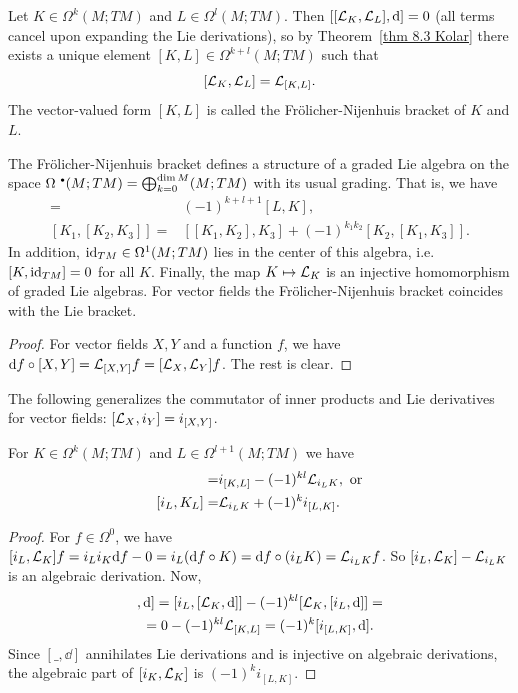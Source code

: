 \begin{defn}
    Let $K\in\Omega^k(M;TM)$ and $L\in\Omega^l(M;TM)$. Then $[[\mathcal{L}_K,\mathcal{L}_L],{\mathrm{d}}]=0$ (all terms cancel upon expanding the Lie derivations), so by Theorem~\ref{thm 8.3 Kolar} there exists a unique element $[K,L]\in \Omega^{k+l}(M;TM)$ such that 
    \[[\mathcal{L}_K,\mathcal{L}_L]=\mathcal{L}_{[K,L]}.\]
    The vector-valued form $[K,L]$ is called the Fr\"olicher-Nijenhuis bracket of $K$ and $L$.
\end{defn}


\begin{thm}
    The Fr\"olicher-Nijenhuis bracket defines a structure of a graded Lie algebra on the space $\Omega^{\smbullet}(M;TM)=\bigoplus_{k=0}^{\dim M}(M;TM)$ with its usual grading. That is, we have 
    \begin{align}
        [K,L]=&(-1)^{k+l+1}[L,K],\\
        [K_1,[K_2,K_3]]=&[[K_1,K_2],K_3]+(-1)^{k_1k_2}[K_2,[K_1,K_3]].
    \end{align}
    In addition, $\operatorname{id}_{TM}\in\Omega^1(M;TM)$ lies in the center of this algebra, i.e.\ $[K,\operatorname{id}_{TM}]=0$ for all $K$. Finally, the map $K\mapsto \mathcal{L}_K$ is an injective homomorphism of graded Lie algebras. For vector fields the Fr\"olicher-Nijenhuis bracket coincides with the Lie bracket.
\end{thm}
\begin{proof}
    For vector fields $X,Y$ and a function $f$, we have ${\mathrm{d}} f\circ [X,Y]=\mathcal{L}_{[X,Y]}f=[\mathcal{L}_X,\mathcal{L}_Y]f$. The rest is clear.
\end{proof}

The following generalizes the commutator of inner products and Lie derivatives for vector fields: $[\mathcal{L}_X,i_Y]=i_{[X,Y]}$.
\begin{lem}\label{lem 8.6 Kolar}
    For $K\in\Omega^k(M;TM)$ and $L\in\Omega^{l+1}(M;TM)$ we have 
    \begin{align}
        [\Lie_K,i_L]=&i_{[K,L]}-(-1)^{kl}\Lie_{i_L K}, \text{ or}\\
        [i_L,K_L]=&\Lie_{i_L K}+(-1)^ki_{[L,K]}.
    \end{align}
\end{lem}
\begin{proof}
    For $f\in\Omega^0$, we have $[i_L,\mathcal{L}_K]f=i_Li_K{\mathrm{d}} f-0=i_L({\mathrm{d}} f\circ K)={\mathrm{d}} f\circ (i_L K)=\mathcal{L}_{i_L K} f$. So $[i_L,\mathcal{L}_K]-\mathcal{L}_{i_L K}$ is an algebraic derivation. Now, 
    \begin{multline}
        [[i_L,\Lie_K],\dd]=[i_L,[\Lie_K,\dd]]-(-1)^{kl}[\Lie_K,[i_L,\dd]]=\\
        =0-(-1)^{kl}\Lie_{[K,L]}=(-1)^k[i_{[L,K]},\dd].
    \end{multline}
    Since $[\_,\dd]$ annihilates Lie derivations and is injective on algebraic derivations, the algebraic part of $[i_K,\mathcal{L}_K]$ is $(-1)^k i_{[L,K]}$.
\end{proof}


